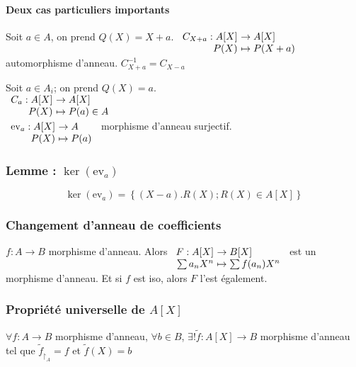 \documentclass[reqno,a4paper,10pt]{report}
\makeatletter
\newcommand{\mt}[1]{\widetilde{#1}} %
\newcommand{\set}[1]{\left\lbrace #1 \right\rbrace} %
\newcommand{\rstrct}[2]{{#1}_{\upharpoonright_{#2}}} %
\newcommand{\pfootnote}[1]{\up{(}\footnote{#1}\up{)}} %
\newcommand{\ev}[1]{\mathrm{ev}_{ #1 }}
\let\oldenumerate=\enumerate%
\renewenvironment{enumerate}{%
    \oldenumerate%
  }{%
    \@noparlisttrue%
    \endlist%
  }%
\makeatother
\begin{document}
\paragraph{Deux cas particuliers importants}
\begin{enumerate}
  \item Soit $a\in A$, on prend $Q(X) = X + a$.
    $\begin{array}[t]{r@{\ }l}
      C_{X+a} : A[X] &\to A[X]\\
      P(X) &\mapsto P(X+a)
    \end{array}$ automorphisme d'anneau. $C_{X+a}^{-1}=C_{X-a}$
  \item Soit $a\in A_i$; on prend $Q(X)=a$.\\
    $\begin{array}[t]{r@{\ }l}
      C_a: A[X] &\to A[X]\\
      P(X) &\mapsto P(a) \in A
    \end{array}$\\
    $\begin{array}[t]{r@{\ }l}
       \ev{a}: A[X] &\to A\\
      P(X) &\mapsto P(a)
    \end{array}$ morphisme d'anneau surjectif.
\end{enumerate} 
\subsubsection{Lemme : $\ker(\ev a)$}
\[\ker(\ev a) = \set{(X-a).R(X); R(X) \in A[X]}\]
\begin{comment}
preuve 07/10/09 p1
\end{comment}

\subsubsection{Changement d'anneau de coefficients}
$f:A \to B$ morphisme d'anneau. Alors $
\begin{array}[t]{r@{\ }l}
  F: A[X] &\to B[X]\\
  \sum a_n X^n &\mapsto \sum f(a_n) X^n
\end{array}$ est un morphisme d'anneau. Et si $f$ est iso, alors $F$ l'est
également.

\subsubsection{Propriété universelle de $A[X]$}
$\forall f : A \to B$ morphisme d'anneau, $\forall b \in B$, $\exists !
\mt{f} : A[X] \to B$ morphisme d'anneau tel que $\rstrct{\mt{f}}{A} = f$ et
$\mt{f}(X)=b$ 
\begin{comment}
  \pfootnote{Preuve 07/10/09 p1 verso}
\end{comment}
\end{document}

